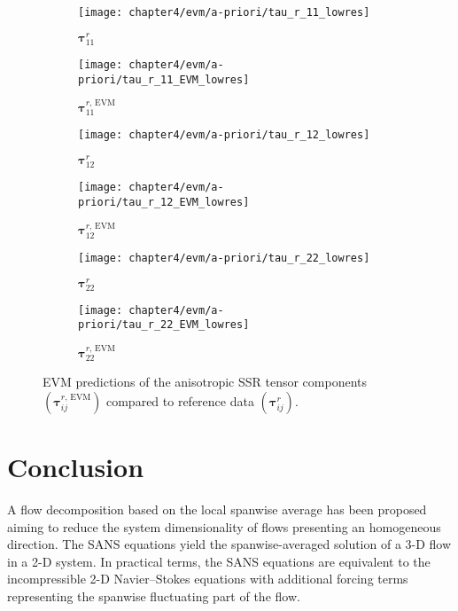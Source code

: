 \documentclass[../main.tex]{subfiles}
\begin{document}
\begin{figure}[!ht]
\centering
\begin{subfigure}[t]{0.6\linewidth}
    \texttt{[image: chapter4/evm/a-priori/tau\_r\_11\_lowres]}
    \caption{$\boldsymbol\tau^r_{11}$} 
\end{subfigure}
\begin{subfigure}[t]{0.6\linewidth}
    \texttt{[image: chapter4/evm/a-priori/tau\_r\_11\_EVM\_lowres]}
    \caption{$\boldsymbol\tau^{r,\,\mathrm{EVM}}_{11}$}
\end{subfigure}
\begin{subfigure}[t]{0.6\linewidth}
    \texttt{[image: chapter4/evm/a-priori/tau\_r\_12\_lowres]}
    \caption{$\boldsymbol\tau^r_{12}$}
\end{subfigure}
\begin{subfigure}[t]{0.6\linewidth}
    \texttt{[image: chapter4/evm/a-priori/tau\_r\_12\_EVM\_lowres]}
    \caption{$\boldsymbol\tau^{r,\,\mathrm{EVM}}_{12}$}
\end{subfigure}
\begin{subfigure}[t]{0.6\linewidth}
    \texttt{[image: chapter4/evm/a-priori/tau\_r\_22\_lowres]}
    \caption{$\boldsymbol\tau^r_{22}$}
\end{subfigure}
\begin{subfigure}[t]{0.6\linewidth}
    \texttt{[image: chapter4/evm/a-priori/tau\_r\_22\_EVM\_lowres]}
    \caption{$\boldsymbol\tau^{r,\,\mathrm{EVM}}_{22}$}
\end{subfigure}
\caption{EVM predictions of the anisotropic SSR tensor components $(\boldsymbol\tau^{r,\,\mathrm{EVM}}_{ij})$ compared to reference data $(\boldsymbol\tau^{r}_{ij})$.}
\label{fig:EVM_a-priori}
\end{figure}

\clearpage
\section{Conclusion}

A flow decomposition based on the local spanwise average has been proposed  aiming to reduce the system dimensionality of flows presenting an homogeneous direction.
The SANS equations yield the spanwise-averaged solution of a 3-D flow in a 2-D system.
In practical terms, the SANS equations are equivalent to the incompressible 2-D Navier--Stokes equations with additional forcing terms representing the spanwise fluctuating part of the flow.
\end{document}
